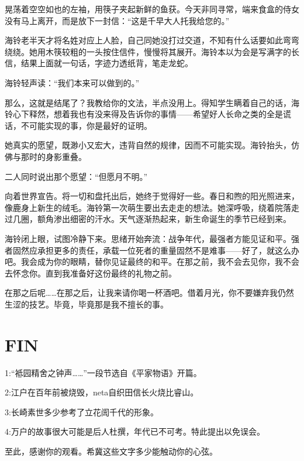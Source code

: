 \documentclass{article}
\begin{document}
晃荡着空空如也的左袖，用筷子夹起新鲜的鱼获。今天非同寻常，端来食盒的侍女没有马上离开，而是放下一封信：“这是千早大人托我给您的。”



海铃老半天才将名姓对应上人脸，自己同她没打过交道，不知有什么话要如此弯弯绕绕。她用木筷较粗的一头按住信件，慢慢将其展开。海铃本以为会是写满字的长信，结果上面就一句话，字迹力透纸背，笔走龙蛇。



海铃轻声读：“我们本来可以做到的。”



那么，这就是结尾了？我教给你的文法，半点没用上。得知学生瞒着自己的话，海铃心下释然，想着我也有没来得及告诉你的事情——希望好人长命之类的全是谎话，不可能实现的事，你是最好的证明。



她真实的愿望，既渺小又宏大，违背自然的规律，因而不可能实现。海铃抬头，仿佛与那时的身影重叠。



二人同时说出那个愿望：“但愿月不明。”



向着世界宣告。将一切和盘托出后，她终于觉得好一些。春日和煦的阳光照进来，像鹿身上新生的绒毛。海铃第一次萌生要出去走走的想法。她深呼吸，绕着院落走过几圈，额角渗出细密的汗水。天气逐渐热起来，新生命诞生的季节已经到来。



海铃闭上眼，试图冷静下来。思绪开始奔流：战争年代，最强者方能见证和平。强者固然应承担更多的责任，承载一位死者的重量固然不是难事——好了，就这么办吧。我会成为你的眼睛，替你见证最终的和平。在那之前，我不会去见你，我不会去怀念你。直到我准备好这份最终的礼物之前。



在那之后呢……在那之后，让我来请你喝一杯酒吧。借着月光，你不要嫌弃我仍然生涩的技艺。毕竟，毕竟那是我不擅长的事。





{\centering\section*{FIN}}





1:“袛园精舍之钟声……”一段节选自《平家物语》开篇。



2:江户在百年前被烧毁，neta自织田信长火烧比睿山。



3:长崎素世多少参考了立花訚千代的形象。



4:万户的故事很大可能是后人杜撰，年代已不可考。特此提出以免误会。



至此，感谢你的观看。希冀这些文字多少能触动你的心弦。
\end{document}
